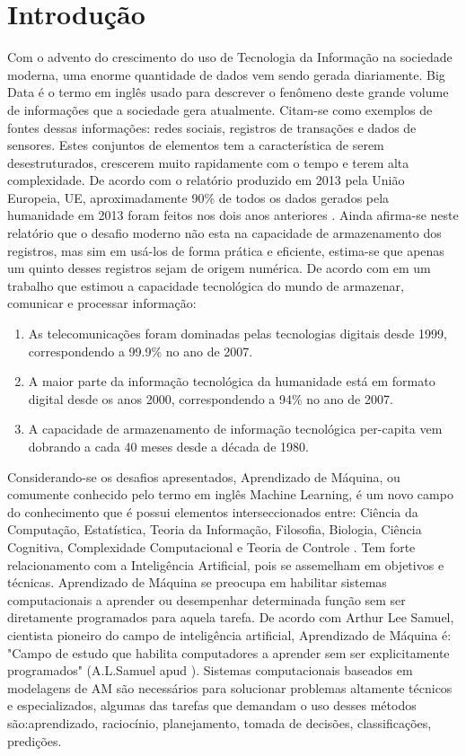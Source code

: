 \chapter{Introdução}


Com o advento do crescimento do uso de Tecnologia da Informação na sociedade moderna, uma enorme quantidade de dados vem sendo gerada diariamente. Big Data é o termo em inglês usado para descrever o fenômeno deste grande volume de informações que a sociedade gera atualmente. Citam-se como exemplos de fontes dessas informações: redes sociais, registros de transações e dados de sensores. Estes conjuntos de elementos tem a característica de serem desestruturados, crescerem muito rapidamente com o tempo e terem alta complexidade. De acordo com o relatório produzido em 2013 pela União Europeia, UE, aproximadamente 90\% de todos os dados gerados pela humanidade em 2013 foram feitos nos dois anos anteriores \cite{eu2013}. Ainda afirma-se neste relatório que o desafio moderno não esta na capacidade de armazenamento dos registros, mas sim em usá-los de forma prática e eficiente, estima-se que apenas um quinto desses registros sejam de origem numérica. De acordo com \cite{lopez2011} em um trabalho que estimou a capacidade tecnológica do mundo de armazenar, comunicar e processar informação: 
\begin{enumerate}
\item As telecomunicações foram dominadas pelas tecnologias digitais desde 1999, correspondendo a 99.9\% no ano de 2007. 
\item A maior parte da informação tecnológica da humanidade está em formato digital desde os anos 2000, correspondendo a 94\% no ano de 2007.
\item A capacidade de armazenamento de informação tecnológica per-capita vem dobrando a cada 40 meses desde a década de 1980.
\end{enumerate}
   

Considerando-se os desafios apresentados, Aprendizado de Máquina, ou comumente conhecido pelo termo em inglês Machine Learning, é um novo campo do conhecimento que é possui elementos  interseccionados entre: Ciência da Computação, Estatística, Teoria da Informação, Filosofia, Biologia, Ciência Cognitiva, Complexidade Computacional e Teoria de Controle \cite{mitch1997}. Tem forte relacionamento  com a Inteligência Artificial, pois se assemelham em objetivos e técnicas. Aprendizado de Máquina se preocupa em habilitar sistemas computacionais a aprender ou desempenhar determinada função sem ser diretamente programados para aquela tarefa. De acordo com Arthur Lee Samuel, cientista pioneiro do campo de inteligência artificial, Aprendizado de Máquina é: "Campo de estudo que habilita computadores a aprender sem ser explicitamente programados" (A.L.Samuel apud ). Sistemas computacionais baseados em modelagens de AM são necessários para solucionar problemas altamente técnicos e especializados, algumas das tarefas que demandam o uso desses métodos são:aprendizado, raciocínio, planejamento, tomada de decisões, classificações, predições. 

